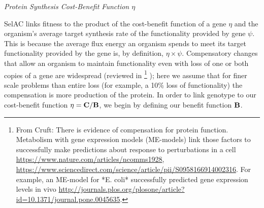 \documentclass[12pt,letterpaper,fleqn]{article}
\renewcommand{\subsection}[1]{%
\bigskip
\begin{center}
\begin{large}
\normalfont\itshape #1
\end{large}
\end{center}}
\newcommand{\Cost}{\ensuremath{\text{\textbf{C}}}\xspace}
\newcommand{\Func}{\ensuremath{\text{\textbf{B}}}\xspace}
\newcommand{\selac}{SelAC\xspace}
\begin{document}
\subsection{Protein Synthesis Cost-Benefit Function $\eta$}
\selac links fitness to the product of the cost-benefit function of a gene $\eta$ and the organism's average target synthesis rate of the functionality provided by gene $\psi$.
This is because the average flux energy an organism spends to meet its target functionality provided by the gene is, by definition, $\eta \times \psi$.
Compensatory changes that allow an organism to maintain functionality even with loss of one or both copies of a gene are widespread (reviewed in 
\footnote{From Cruft:
There is evidence of compensation for protein function. Metabolism with gene expression models (ME-models) link those factors to successfully make predictions about response to perturbations in a cell \url{https://www.nature.com/articles/ncomms1928}, \url{https://www.sciencedirect.com/science/article/pii/S0958166914002316}. For example, an ME-model for *E. coli* successfully predicted gene expression levels in vivo \url{http://journals.plos.org/plosone/article?id=10.1371/journal.pone.0045635}.
}
); here we assume that for finer scale problems than entire loss (for example, a 10\% loss of functionality) the compensation is more production of the protein.
In order to link genotype to our cost-benefit function $\eta = \Cost/\Func$, we begin by defining our benefit function \Func.

\end{document}

